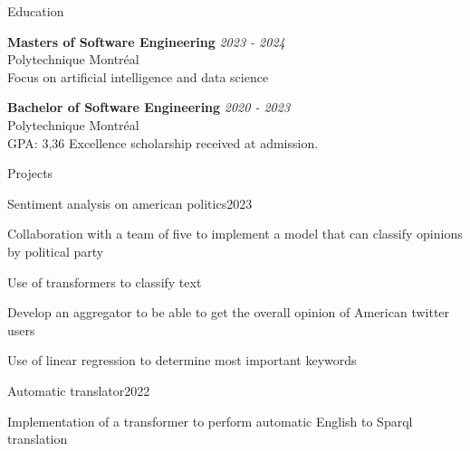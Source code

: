\documentclass{resume} %
\begin{document}
	
	
	\begin{rSection}{Education}

		{\bf Masters of Software Engineering} \hfill {\em 2023 - 2024} 
		\\ Polytechnique Montréal
		\\ Focus on artificial intelligence and data science
		
		{\bf Bachelor of Software Engineering} \hfill {\em 2020 - 2023} 
		\\ Polytechnique Montréal
		\\GPA: 3,36 \hspace{0.5cm}  Excellence scholarship received at admission.
		
		
	\end{rSection}
	
	\begin{rSection}{Projects}
		\begin{rSubsection}{Sentiment analysis on american politics}{2023}{}{}
			\item Collaboration with a team of five to implement a model that can classify opinions by political party
			\item Use of transformers to classify text
			\item Develop an aggregator to be able to get the overall opinion of American twitter users
			\item Use of linear regression to determine most important keywords
		 \end{rSubsection}
		\begin{rSubsection}{Automatic translator}{2022}{}{}
			\item Implementation of a transformer to perform automatic English to Sparql translation
		 \end{rSubsection}
		
	\end{rSection}
	
	
	
\end{document}
